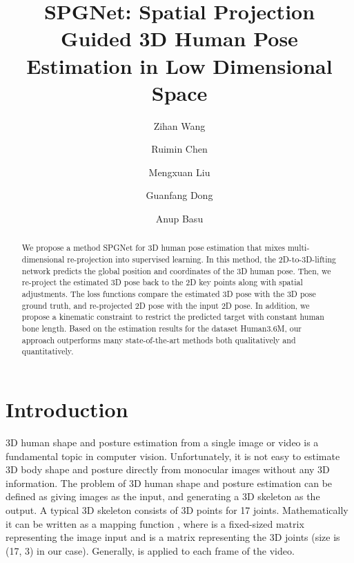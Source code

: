 \documentclass[runningheads]{llncs}
\begin{document}
\title{SPGNet: Spatial Projection Guided 3D Human Pose Estimation in Low Dimensional Space}
\author{Zihan Wang \and
Ruimin Chen  \and
Mengxuan Liu \and
Guanfang Dong  \and
Anup Basu 
}



\maketitle              \begin{abstract}
We propose a method SPGNet for 3D human pose estimation that mixes multi-dimensional re-projection into supervised learning. In this method, the 2D-to-3D-lifting network predicts the global position and coordinates of the 3D human pose. Then, we re-project the estimated 3D pose back to the 2D key points along with spatial adjustments. The loss functions compare the estimated 3D pose with the 3D pose ground truth, and re-projected 2D pose with the input 2D pose. In addition, we propose a kinematic constraint to restrict the predicted target with constant human bone length. Based on the estimation results for the dataset Human3.6M, our approach outperforms many state-of-the-art methods both qualitatively and quantitatively.
 
\end{abstract}


\section{Introduction}
3D human shape and posture estimation from a single image or video is a fundamental topic in computer vision. Unfortunately, it is not easy to estimate 3D body shape and posture directly from monocular images without any 3D information. The problem of 3D human shape and posture estimation can be defined as giving images as the input, and generating a 3D skeleton as the output. A typical 3D skeleton consists of 3D points for 17 joints. Mathematically it can be written as a mapping function , where  is a fixed-sized matrix representing the image input and  is a matrix representing the 3D joints (size is (17, 3) in our case). Generally,  is applied to each frame of the video.
\end{document}
